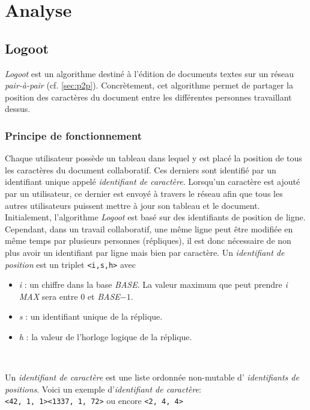 \chapter{Analyse}

\section{Logoot}
	\emph{Logoot} est un algorithme destiné à l'édition de documents textes sur
	un réseau \emph{pair-à-pair} (cf. \ref{sec:p2p}). Concrètement, cet
	algorithme permet de partager la position des caractères du document entre
	les différentes personnes travaillant dessus.
	
	\subsection{Principe de fonctionnement}
		Chaque utilisateur possède un tableau dans lequel y est placé la
		position de tous les caractères du document collaboratif. Ces derniers
		sont identifié par un identifiant unique appelé \emph{identifiant de
		caractère}. Lorsqu'un caractère est ajouté par un utilisateur, ce
		dernier est envoyé à travers le réseau afin que tous les autres
		utilisateurs puissent mettre à jour	son	tableau et le document.\\
		
		Initialement, l'algorithme \emph{Logoot} est basé sur des identifiants
		de position de ligne. Cependant, dans un travail collaboratif, une même
		ligne peut être modifiée en même temps par plusieurs personnes
		(répliques), il est	donc nécessaire de non plus avoir un identifiant par
		ligne mais bien par caractère. Un \emph{identifiant de position} est
		un triplet
		\verb+<i,s,h>+ avec 
		\begin{itemize}
			\item \emph{i} : un chiffre dans la base \emph{BASE}. La valeur
			maximum que peut prendre \emph{i} \emph{MAX} sera entre $0$ et
			\emph{BASE}$ - 1$.
			\item \emph{s} : un identifiant unique de la réplique.
			\item \emph{h} : la valeur de l'horloge logique de la réplique.
		\end{itemize}~
		
		Un \emph{identifiant de caractère} est une liste ordonnée non-mutable d'
		\emph{identifiants de positions}. Voici un exemple d'\emph{identifiant
		de caractère}: \\
		\verb+<42, 1, 1><1337, 1, 72>+ ou encore \verb+<2, 4, 4>+\\
		
